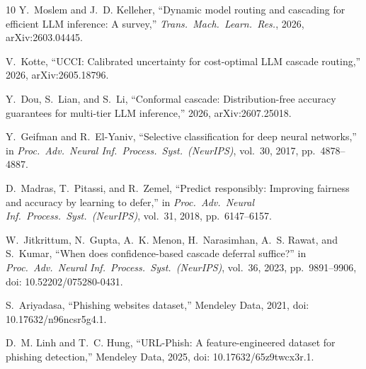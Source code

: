 \documentclass[conference,a4paper]{IEEEtran}
\begin{document}
\begin{thebibliography}{10}
Y.~Moslem and J.~D. Kelleher, ``Dynamic model routing and cascading for efficient
LLM inference: A survey,'' \emph{Trans.\ Mach.\ Learn.\ Res.}, 2026,
arXiv:2603.04445.

V.~Kotte, ``UCCI: Calibrated uncertainty for cost-optimal LLM cascade routing,''
2026, arXiv:2605.18796.

Y.~Dou, S.~Lian, and S.~Li, ``Conformal cascade: Distribution-free accuracy
guarantees for multi-tier LLM inference,'' 2026, arXiv:2607.25018.

Y.~Geifman and R.~El-Yaniv, ``Selective classification for deep neural
networks,'' in \emph{Proc.\ Adv.\ Neural Inf.\ Process.\ Syst.\ (NeurIPS)},
vol.~30, 2017, pp.~4878--4887.

D.~Madras, T.~Pitassi, and R.~Zemel, ``Predict responsibly: Improving fairness
and accuracy by learning to defer,'' in \emph{Proc.\ Adv.\ Neural Inf.\ Process.\
Syst.\ (NeurIPS)}, vol.~31, 2018, pp.~6147--6157.

W.~Jitkrittum, N.~Gupta, A.~K. Menon, H.~Narasimhan, A.~S. Rawat, and
S.~Kumar, ``When does confidence-based cascade deferral suffice?'' in
\emph{Proc.\ Adv.\ Neural Inf.\ Process.\ Syst.\ (NeurIPS)}, vol.~36, 2023,
pp.~9891--9906, doi: 10.52202/075280-0431.

S.~Ariyadasa, ``Phishing websites dataset,'' Mendeley Data, 2021,
doi: 10.17632/n96ncsr5g4.1.

D.~M. Linh and T.~C. Hung, ``URL-Phish: A feature-engineered dataset for
phishing detection,'' Mendeley Data, 2025, doi: 10.17632/65z9twcx3r.1.

\end{thebibliography}
\end{document}
